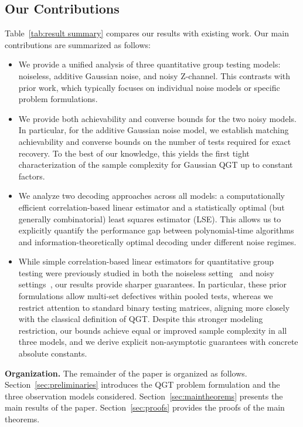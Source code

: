 \documentclass{article}
\begin{document}
\subsection{Our Contributions}
Table~\ref{tab:result summary} compares our results with existing work.
Our main contributions are summarized as follows:
\begin{itemize}
    \item 
    We provide a unified analysis of three quantitative group testing models: noiseless, additive Gaussian noise, and noisy Z-channel.
    This contrasts with prior work, which typically focuses on individual noise models or specific problem formulations.
    \item
    We provide both achievability and converse bounds for the two noisy models.
    In particular, for the additive Gaussian noise model, we establish matching achievability and converse bounds on the number of tests required for exact recovery.
    To the best of our knowledge, this yields the first tight characterization of the sample complexity for Gaussian QGT up to constant factors.
    \item
    We analyze two decoding approaches across all models:
    a computationally efficient correlation-based linear estimator and a statistically optimal (but generally combinatorial) least squares estimator (LSE).
    This allows us to explicitly quantify the performance gap between polynomial-time algorithms and information-theoretically optimal decoding under different noise regimes.
    \item
    While simple correlation-based linear estimators for quantitative group testing were previously studied in both the noiseless setting~\cite{gebhard2019quantitative}\cite{gebhard2022parallel} and noisy settings~\cite{hahn-klimroth_distributed_2022}, our results provide sharper guarantees.
    In particular, these prior formulations allow multi-set defectives within pooled tests, whereas we restrict attention to standard binary testing matrices, aligning more closely with the classical definition of QGT.
    Despite this stronger modeling restriction, our bounds achieve equal or improved sample complexity in all three models, and we derive explicit non-asymptotic guarantees with concrete absolute constants.
\end{itemize}
\textbf{Organization.} The remainder of the paper is organized as follows.
Section~\ref{sec:preliminaries} introduces the QGT problem formulation and the three observation models considered.
Section~\ref{sec:maintheorems} presents the main results of the paper.
Section~\ref{sec:proofs} provides the proofs of the main theorems.
\end{document}
